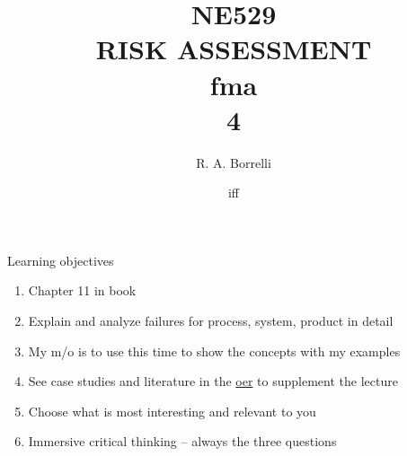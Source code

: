 \documentclass[aspectratio=1610,pdftex,dvipsnames,compress,xcolor={dvipsnames}]{beamer}
\title[NE529 -- Risk Assessment]{NE529\\RISK ASSESSMENT\\\acl{fma}\\4}
\author[@TheDoctorRAB]{R. A. Borrelli}
\institute[]{
    \acl{ui}\\
    \vspace{0.10in}
    }
\date{\acl{iff}}
\newcommand{\acs}{\acrshort} %
\begin{document}
\nobibliography* %


{
    \begin{frame}[plain]{}
        \titlepage
    \end{frame}
}


\begin{frame}{Learning objectives}
    \begin{enumerate}[series=outerlist,topsep=0pt,itemsep=21pt,leftmargin=*,label=(\arabic*)]
        \item[]Chapter 11 in book
        \item[]Explain and analyze failures for process, system, product in detail
        \item[]My m/o is to use this time to show the concepts with my examples
        \item[]See case studies and literature in the \href{https://uidaho.pressbooks.pub/riskassessment/}{\acs{oer}} to supplement the lecture
        \item[]Choose what is most interesting and relevant to you
        \item[]Immersive critical thinking -- always the three questions 
    \end{enumerate}
\end{frame}
\end{document}
